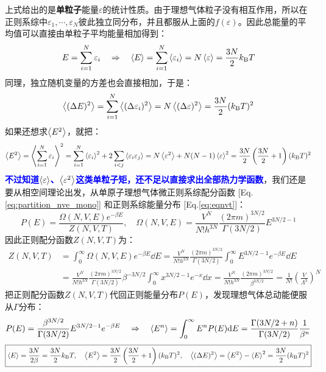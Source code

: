 上式给出的是\textbf{单粒子}能量$\varepsilon$的统计性质。由于理想气体粒子没有相互作用，所以在正则系综中$\varepsilon_1,\cdots,\varepsilon_N$彼此独立同分布，并且都服从上面的$f(\varepsilon)$。因此总能量的平均值可以直接由单粒子平均能量相加得到：
\[E=\sum_{i=1}^{N}\varepsilon_i \quad \Rightarrow \quad\expval{E}=\sum_{i=1}^{N}\expval{\varepsilon_i}=N\expval{\varepsilon}=\frac{3N}{2}k_{\rm B} T\]
同理，独立随机变量的方差也会直接相加，于是：
\[\expval{(\Delta E)^2}=\sum_{i=1}^{N}\expval{(\Delta \varepsilon_i)^2}=N\expval{(\Delta \varepsilon)^2}=\frac{3N}{2}(k_{\rm B} T)^2\]
如果还想求$\expval{E^2}$，就把：
\[\expval{E^2}=\left\langle\sum_{i=1}^{N}\varepsilon_i\right\rangle^2=\sum_{i=1}^{N}\left\langle\varepsilon_i\right\rangle^2+2\sum_{i<j}\left\langle\varepsilon_i\varepsilon_j\right\rangle=N\expval{\varepsilon^2}+N(N-1)\expval{\varepsilon}^2=\frac{3N}{2}\left(\frac{3N}{2}+1\right)(k_{\rm B} T)^2\]
\textcolor{blue}{\textbf{不过知道$\expval{\varepsilon}$、$\expval{\varepsilon^2}$这类单粒子矩，还不足以直接求出全部热力学函数}}，我们还是要从相空间理论出发，从单原子理想气体微正则系综配分函数 [Eq.\eqref{eq:partition_nve_mono}] 和正则系综能量分布 [Eq.\eqref{eq:eqnvt}]：
\[P(E)=\frac{\Omega(N,V,E)e^{-\beta E}}{Z(N,V,T)}, \quad \Omega(N,V,E)=\frac{V^N}{N!h^{3N}}\frac{(2\pi m)^{3N/2}}{\Gamma(3N/2)}E^{3N/2-1}\]
因此正则配分函数$Z(N,V,T)$为：
\[\begin{aligned}
Z(N,V,T)&=\int_0^\infty \Omega(N,V,E)e^{-\beta E}\dd E=\frac{V^N}{N!h^{3N}}\frac{(2\pi m)^{3N/2}}{\Gamma(3N/2)}\int_0^\infty E^{3N/2-1}e^{-\beta E}\dd E\\
&=\frac{V^N}{N!h^{3N}}\frac{(2\pi m)^{3N/2}}{\Gamma(3N/2)}\beta^{-3N/2}\int_0^\infty x^{3N/2-1}e^{-x}\dd x=\frac{V^N}{N!h^{3N}}\frac{(2\pi m)^{3N/2}}{\beta^{3N/2}}=\frac{1}{N!}\left(\frac{V}{\Lambda^3}\right)^N
\end{aligned}\]
把正则配分函数$Z(N,V,T)$代回正则能量分布$P(E)$，发现理想气体总动能便服从$\Gamma$分布：
\[P(E)=\frac{\beta^{3N/2}}{\Gamma(3N/2)}E^{3N/2-1}e^{-\beta E} \quad \Rightarrow \quad \expval{E^n}=\int_0^\infty E^n P(E)\dd E=\frac{\Gamma(3N/2+n)}{\Gamma(3N/2)}\frac{1}{\beta^n}\]
\[\boxed{\expval{E}=\frac{3N}{2\beta}=\frac{3N}{2}k_{\rm B} T,\quad \expval{E^2}=\frac{3N}{2}\left(\frac{3N}{2}+1\right)(k_{\rm B} T)^2, \quad \expval{(\Delta E)^2}=\expval{E^2}-\expval{E}^2=\frac{3N}{2}(k_{\rm B} T)^2}\]

